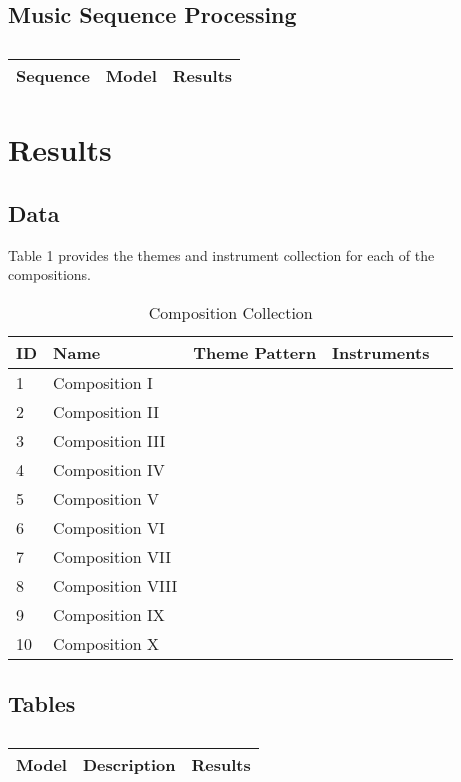 \subsection{Music Sequence Processing}

\centering	
\begin{table}[H]\tiny
	\caption{}	
	\begin{tabular}{r|p{4cm}|l}
		\hline	
		Sequence & Model & Results \\
		\hline 
		\hline 
	\end{tabular}
\end{table}

\section{Results}

\subsection{Data}

Table 1 provides the themes and instrument collection for each of the compositions.
	
\begin{table}[H]
\caption{Composition Collection}	
\begin{tabular}{p{1cm}p{4cm}p{2cm}p{1cm}p{1cm}}
\hline
ID & Name & Theme Pattern & Instruments & \\
\hline 
1 & Composition I &  &  & \\
2 & Composition II &  &  & \\
3 & Composition III &  & \\
4 & Composition IV & & \\
5 & Composition V & & & \\
\hline 
6 & Composition VI &  &  & \\
7 & Composition VII &  &  & \\
8 & Composition VIII &  & \\
9 & Composition IX & & \\
10 & Composition X & & & \\
\end{tabular}
\end{table}

\subsection{Tables}

\centering	
\begin{table}[H]\tiny
	\caption{}	
	\begin{tabular}{r|p{4cm}|l}
		\hline	
		Model & Description & Results \\
		\hline 
		\hline 
	\end{tabular}
\end{table}

